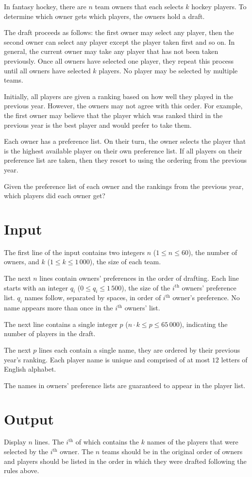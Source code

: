 
In fantasy hockey, there are $n$ team owners that each selects $k$
hockey players.  To determine which owner gets which players, the
owners hold a draft.

The draft proceeds as follows: the first owner may select any player,
then the second owner can select any player except the player taken
first and so on. In general, the current owner may take any player
that has not been taken previously.  Once all owners have selected one
player, they repeat this process until all owners have selected $k$
players.  No player may be selected by multiple teams.

Initially, all players are given a ranking based on how well they
played in the previous year. However, the owners may not agree with
this order. For example, the first owner may believe that the player
which was ranked third in the previous year is the best player and
would prefer to take them.

Each owner has a preference list. On their
turn, the owner selects the player that is the highest available
player on their own preference list.  If all players on their
preference list are taken, then they resort to using the ordering from
the previous year.

Given the preference list of each owner and the rankings from the
previous year, which players did each owner get?

\section*{Input}

The first line of the input contains two integers $n$
($1 \leq n \leq 60$), the number of owners, and $k$
($1 \leq k \leq 1\,000$), the size of each team.

The next $n$ lines contain owners' preferences in the order of
drafting.  Each line starts with an integer $q_i$ ($0 \leq q_i \leq 1\,500$), the size of the
$i^\textrm{th}$ owners' preference list.  $q_i$ names follow, separated by
spaces, in order of $i^\textrm{th}$ owner's preference. No name appears
more than once in the $i^\textrm{th}$ owners' list.

The next line contains a single integer $p$
($n \cdot k \leq p \leq 65\,000$), indicating the number of players in
the draft.

The next $p$ lines each contain a single name, they are ordered by
their previous year's ranking.  Each player name is unique and
 comprised of at most $12$ letters of English alphabet.

The names in owners' preference lists are guaranteed to appear in the
player list.

\section*{Output}

Display $n$ lines. The $i^\textrm{th}$ of which contains the $k$ names of the
players that were selected by the $i^\textrm{th}$ owner.  The $n$ teams
should be in the original order of owners and players should be listed
in the order in which they were drafted following the rules above.
